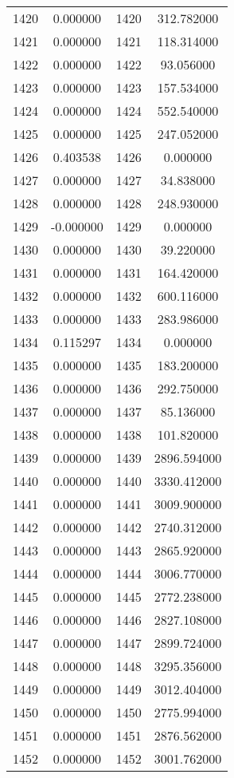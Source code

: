 \documentclass[12pt]{article}
\begin{document}
\begin{longtable}{@{}cccc@{}}
1420 & 0.000000 & 1420 & 312.782000 \\
1421 & 0.000000 & 1421 & 118.314000 \\
1422 & 0.000000 & 1422 & 93.056000 \\
1423 & 0.000000 & 1423 & 157.534000 \\
1424 & 0.000000 & 1424 & 552.540000 \\
1425 & 0.000000 & 1425 & 247.052000 \\
1426 & 0.403538 & 1426 & 0.000000 \\
1427 & 0.000000 & 1427 & 34.838000 \\
1428 & 0.000000 & 1428 & 248.930000 \\
1429 & -0.000000 & 1429 & 0.000000 \\
1430 & 0.000000 & 1430 & 39.220000 \\
1431 & 0.000000 & 1431 & 164.420000 \\
1432 & 0.000000 & 1432 & 600.116000 \\
1433 & 0.000000 & 1433 & 283.986000 \\
1434 & 0.115297 & 1434 & 0.000000 \\
1435 & 0.000000 & 1435 & 183.200000 \\
1436 & 0.000000 & 1436 & 292.750000 \\
1437 & 0.000000 & 1437 & 85.136000 \\
1438 & 0.000000 & 1438 & 101.820000 \\
1439 & 0.000000 & 1439 & 2896.594000 \\
1440 & 0.000000 & 1440 & 3330.412000 \\
1441 & 0.000000 & 1441 & 3009.900000 \\
1442 & 0.000000 & 1442 & 2740.312000 \\
1443 & 0.000000 & 1443 & 2865.920000 \\
1444 & 0.000000 & 1444 & 3006.770000 \\
1445 & 0.000000 & 1445 & 2772.238000 \\
1446 & 0.000000 & 1446 & 2827.108000 \\
1447 & 0.000000 & 1447 & 2899.724000 \\
1448 & 0.000000 & 1448 & 3295.356000 \\
1449 & 0.000000 & 1449 & 3012.404000 \\
1450 & 0.000000 & 1450 & 2775.994000 \\
1451 & 0.000000 & 1451 & 2876.562000 \\
1452 & 0.000000 & 1452 & 3001.762000 \\

\end{longtable}
\end{document}
